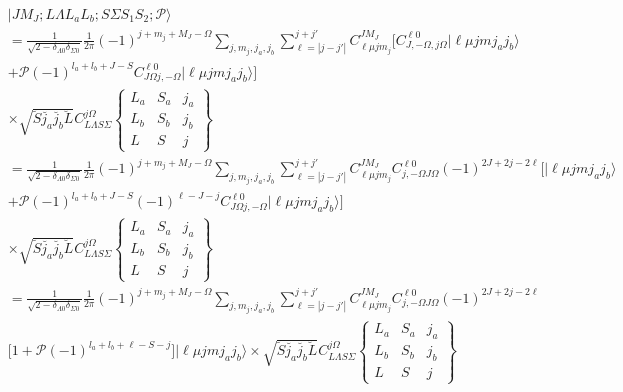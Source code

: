 \documentclass[prl, longbibliography]{revtex4-2}
\begin{document}
\begin{equation}
\begin{split}
&|J M_J; L \Lambda L_a L_b; S \Sigma  S_1 S_2; \mathcal{P} \rangle
\\
&=\frac{1}{\sqrt{2-\delta_{\Lambda 0}\delta_{\Sigma 0}}}
\frac{1}{2\pi}(-1)^{j+m_j+M_J-\Omega}
\sum_{j, m_j, j_a, j_b} \sum_{\ell=|j-j'|}^{j+j'} C_{\ell \mu j m_j}^{J M_J}\bigg[
C_{J,-\Omega, j \Omega}^{\ell 0}
|\ell\mu j m j_a j_b\rangle
\\
&+\mathcal{P}(-1)^{l_a+l_b+J-S}
C_{J\Omega j,-\Omega}^{\ell 0}
|\ell\mu j m j_a j_b\rangle\bigg]
\\
&\times\sqrt{\breve{S}\breve{j_a}\breve{j_b}\breve{L}} 
C_{L \Lambda S \Sigma}^{j \Omega}
\begin{Bmatrix}
L_a & S_a & j_a\\
L_b & S_b & j_b\\
L & S & j
\end{Bmatrix}
\\
&=\frac{1}{\sqrt{2-\delta_{\Lambda 0}\delta_{\Sigma 0}}}
\frac{1}{2\pi}(-1)^{j+m_j+M_J-\Omega}
\sum_{j, m_j, j_a, j_b} \sum_{\ell=|j-j'|}^{j+j'} C_{\ell \mu j m_j}^{J M_J}C_{j,-\Omega J\Omega}^{\ell 0}(-1)^{2J+2j-2\ell}\bigg[
|\ell\mu j m j_a j_b\rangle
\\
&+\mathcal{P}(-1)^{l_a+l_b+J-S}(-1)^{\ell-J-j}
C_{J\Omega j,-\Omega}^{\ell 0}
|\ell\mu j m j_a j_b\rangle\bigg]
\\
&\times\sqrt{\breve{S}\breve{j_a}\breve{j_b}\breve{L}} 
C_{L \Lambda S \Sigma}^{j \Omega}
\begin{Bmatrix}
L_a & S_a & j_a\\
L_b & S_b & j_b\\
L & S & j
\end{Bmatrix}\\
&=\frac{1}{\sqrt{2-\delta_{\Lambda 0}\delta_{\Sigma 0}}}
\frac{1}{2\pi}(-1)^{j+m_j+M_J-\Omega}
\sum_{j, m_j, j_a, j_b} \sum_{\ell=|j-j'|}^{j+j'} C_{\ell \mu j m_j}^{J M_J}C_{j,-\Omega J\Omega}^{\ell 0}(-1)^{2J+2j-2\ell}
\\
&\bigg[1+\mathcal{P}(-1)^{l_a+l_b+\ell-S-j}\bigg]
|\ell\mu j m j_a j_b\rangle
\times\sqrt{\breve{S}\breve{j_a}\breve{j_b}\breve{L}} 
C_{L \Lambda S \Sigma}^{j \Omega}
\begin{Bmatrix}
L_a & S_a & j_a\\
L_b & S_b & j_b\\
L & S & j
\end{Bmatrix}\\
\end{split}
\end{equation}
\end{document}

